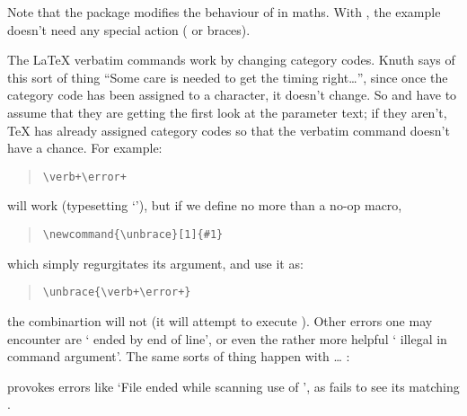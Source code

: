 Note that the  package modifies the behaviour of
\texttt{\bsbs } in maths.  With , the
 example doesn't need any special action
( or braces).


The \LaTeX{} verbatim commands work by changing category codes.  Knuth
says of this sort of thing ``Some care is needed to get the timing
right\dots{}'', since once the category code has been assigned to a
character, it doesn't change.  So  and
 have to assume that they are getting the
first look at the parameter text; if they aren't, \TeX{} has already
assigned category codes so that the verbatim command doesn't have a
chance.  For example:
\begin{quote}
\begin{verbatim}
\verb+\error+
\end{verbatim}
\end{quote}
will work (typesetting `'), but if we define no more than a
no-op macro,
\begin{quote}
\begin{verbatim}
\newcommand{\unbrace}[1]{#1}
\end{verbatim}
\end{quote}
which simply regurgitates its argument, and use it as:
\begin{quote}
\begin{verbatim}
\unbrace{\verb+\error+}
\end{verbatim}
\end{quote}
the combinartion will not (it will attempt to execute ).
Other errors one
may encounter are ` ended by end of line', or even the
rather more helpful ` illegal in command argument'.  The
same sorts of thing happen with  \dots{}
:
\begin{quote}
\begin{quoteverbatim}
\end{quoteverbatim}
\end{quote}
provokes errors like `File ended while scanning use of
', as  fails to see its
matching .

